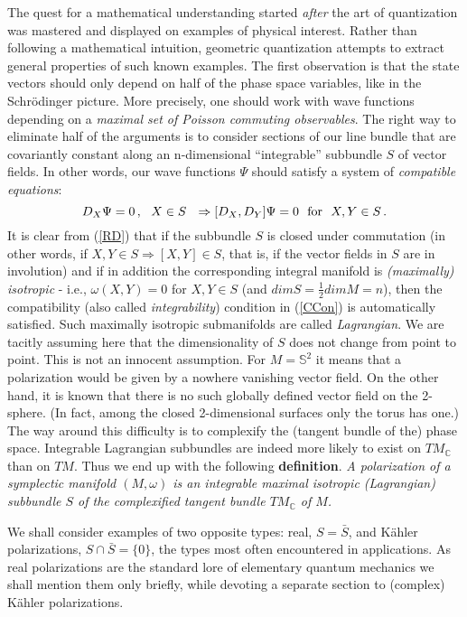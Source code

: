 The quest for a mathematical understanding started {\it after} the art of quantization was mastered and
displayed on examples of physical interest. Rather than following a mathematical intuition, geometric quantization
attempts to extract general properties of such known examples. The first observation is that the state vectors
should only depend on half of the phase space variables, like in the Schr\"odinger picture. More precisely, one
should work with wave functions depending on a {\it maximal set of Poisson commuting observables}.  The right
way to eliminate half of the arguments is to consider sections of our line bundle that are covariantly constant
along an n-dimensional ``integrable'' subbundle $S$ of vector fields. In other words, our wave functions $\Psi$
should satisfy a system of {\it compatible equations}:
\begin{equation}
\label{CCon}
D_X\Psi = 0\,, \ \ X\in S \ \ \Rightarrow [D_X, D_Y]\Psi = 0 \ \ {\rm for} \ \ X, Y \in S\,.
\end{equation}
It is clear from (\ref{RD}) that if the subbundle $S$ is closed under commutation (in other words, if
$X, Y \in S \Rightarrow [X, Y] \in S$, that is, if the vector fields in $S$ are in involution) and if in
addition the corresponding integral manifold is {\it (maximally) isotropic} - i.e., $\omega(X, Y) = 0$ for $X, Y \in S$
(and $dim S = \frac{1}{2} dim M = n$), then the compatibility (also called {\it integrability}) condition in (\ref{CCon}) 
is automatically satisfied.  Such maximally isotropic submanifolds are called {\it Lagrangian}. We are tacitly
assuming here that the dimensionality of $S$ does not change from point to point. This is not an innocent assumption.
For $M = {\mathbb S}^2$ it means that a polarization would be given by a nowhere vanishing vector field. On the other
hand, it is known that there is no such globally defined vector field on the 2-sphere. (In fact, among the closed
2-dimensional surfaces only the torus has one.) The way around this difficulty is to complexify the (tangent bundle of
the) phase space. Integrable Lagrangian subbundles are indeed more likely to exist on $TM_{\mathbb{C}}$ than on $TM$.
Thus we end up with the following {\bf definition}. {\it A polarization of a symplectic manifold $(M, \omega)$ is an
integrable maximal isotropic (Lagrangian) subbundle $S$ of the complexified tangent bundle $TM_{\mathbb{C}}$ of $M$.}

We shall consider examples of two opposite types: real, $S=\bar{S}$, and 
K\"ahler polarizations, $S \cap \bar{S} = \{ 0 \}$, the types most often 
encountered in applications. As real polarizations are the standard lore of 
elementary quantum mechanics we shall mention them only briefly, while 
devoting a separate section to (complex) K\"ahler polarizations.


